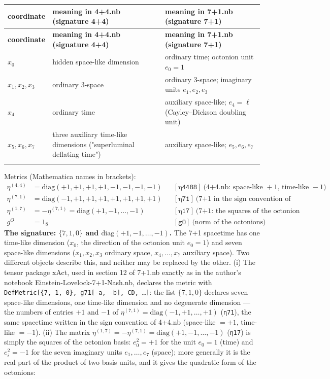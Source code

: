 \documentclass[10pt,a4paper]{article}
\begin{document}
{\small
\begin{longtable}{>{\raggedright\arraybackslash}p{}>{\raggedright\arraybackslash}p{}>{\raggedright\arraybackslash}p{}}
\toprule
\textbf{coordinate} & \textbf{meaning in 4+4.nb (signature 4+4)} & \textbf{meaning in 7+1.nb (signature 7+1)} \\
\midrule\endfirsthead
\toprule
\textbf{coordinate} & \textbf{meaning in 4+4.nb (signature 4+4)} & \textbf{meaning in 7+1.nb (signature 7+1)} \\
\midrule\endhead
\endfoot
\bottomrule\endlastfoot
$x_0$ & hidden space-like dimension & ordinary time; octonion unit $e_0=1$ \\
$x_1,x_2,x_3$ & ordinary 3-space & ordinary 3-space; imaginary units $e_1,e_2,e_3$ \\
$x_4$ & ordinary time & auxiliary space-like; $e_4=\ell$ (Cayley–Dickson doubling unit) \\
$x_5,x_6,x_7$ & three auxiliary time-like dimensions ("superluminal deflating time") & auxiliary space-like; $e_5,e_6,e_7$ \\*
\end{longtable}}
Metrics (Mathematica names in brackets):
\begin{align*}
\eta^{(4,4)}&=\mathrm{diag}(+1,+1,+1,+1,-1,-1,-1,-1) && [\texttt{η4488}]\ \text{(4+4.nb: space-like }+1\text{, time-like }-1) \\
\eta^{(7,1)}&=\mathrm{diag}(-1,+1,+1,+1,+1,+1,+1,+1) && [\texttt{η71}]\ \text{(7+1 in the sign convention of 4+4.nb)} \\
\eta^{(1,7)}&=-\eta^{(7,1)}=\mathrm{diag}(+1,-1,\dots,-1) && [\texttt{η17}]\ \text{(7+1: the squares of the octonion basis)} \\
g^{O}&=1_8 && [\texttt{gO}]\ \text{(norm of the octonions)}
\end{align*}
\textbf{The signature: $\{7,1,0\}$ and $\mathrm{diag}(+1,-1,\dots,-1)$.} The 7+1 spacetime has one time-like dimension ($x_0$, the direction of the octonion unit $e_0=1$) and seven space-like dimensions ($x_1,x_2,x_3$ ordinary space, $x_4,\dots,x_7$ auxiliary space). Two different objects describe this, and neither may be replaced by the other. (i) The tensor package xAct, used in section 12 of 7+1.nb exactly as in the author’s notebook Einstein-Lovelock-7+1-Nash.nb, declares the metric with \texttt{DefMetric[\{7, 1, 0\}, g71[-a, -b], CD, …]}: the list $\{7,1,0\}$ declares seven space-like dimensions, one time-like dimension and no degenerate dimension — the numbers of entries $+1$ and $-1$ of $\eta^{(7,1)}=\mathrm{diag}(-1,+1,\dots,+1)$ (\texttt{η71}), the same spacetime written in the sign convention of 4+4.nb (space-like $=+1$, time-like $=-1$). (ii) The matrix $\eta^{(1,7)}=-\eta^{(7,1)}=\mathrm{diag}(+1,-1,\dots,-1)$ (\texttt{η17}) is simply the squares of the octonion basis: $e_0^2=+1$ for the unit $e_0=1$ (time) and $e_i^2=-1$ for the seven imaginary units $e_1,\dots,e_7$ (space); more generally it is the real part of the product of two basis units, and it gives the quadratic form of the octonions:
\end{document}
